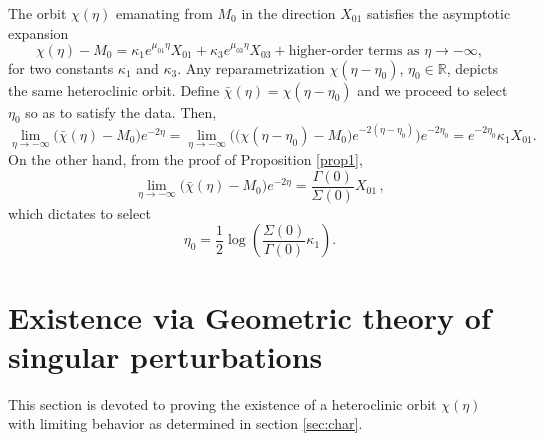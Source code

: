 \documentclass[usletter,11pt]{article}
\theoremstyle{remark}
\begin{document}
The orbit $\chi (\eta)$ emanating from $M_0$ in the direction $X_{01}$ satisfies the asymptotic expansion
 \begin{equation}\label{eq:alpha-expan}
  \chi (\eta) - M_0 = \kappa_1 e^{\mu_{01}\eta} X_{01} + \kappa_3 e^{\mu_{03}\eta} X_{03} + \text{higher-order terms as $\eta \rightarrow -\infty$},
 \end{equation}
for two constants $\kappa_1$ and $\kappa_3$. 
Any reparametrization $\chi(\eta-\eta_0)$, $\eta_0\in \mathbb{R}$, depicts the same heteroclinic orbit. Define
$\bar \chi (\eta) = \chi (\eta - \eta_0)$ and we proceed to select $\eta_0$ so as to satisfy the data. Then,
$$
\lim_{\eta \rightarrow -\infty}\big( \bar\chi(\eta) - M_0\big)e^{-2 \eta} 
= \lim_{\eta \rightarrow -\infty}  \Big ( \big(\chi(\eta-\eta_0) - M_0\big)e^{-2(\eta-\eta_0)} \Big ) e^{-2\eta_0} = e^{ -2\eta_0} \kappa_1 X_{01}.
$$
On the other hand, from the proof of Proposition \ref{prop1}, 
$$
\lim_{\eta \rightarrow -\infty}\big( \bar\chi(\eta) - M_0\big)e^{ -2\eta}  = \frac{\Gamma(0)}{\Sigma(0)} X_{01} \, ,
$$
which dictates to select
\begin{equation}
 \eta_0 = \frac{1}{2}\log \left( \frac{\Sigma(0)}{\Gamma(0)} \kappa_1\right).%
\end{equation}



\section{Existence via Geometric theory of singular perturbations} \label{sec:proof}
This section is devoted to proving the existence of a heteroclinic orbit $\chi(\eta)$ with limiting behavior as determined in  section \ref{sec:char}.
\end{document}
